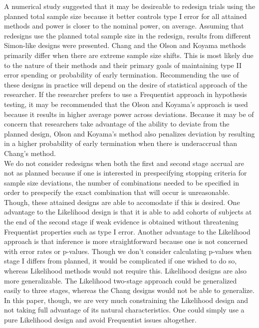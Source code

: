 \documentclass[12pt]{report}\usepackage[]{graphicx}\usepackage[]{color}
\newlength{\li}\setlength{\li}{14.48pt}
\newlength{\di}\setlength{\di}{-3.5mm}
\begin{document}
\indent A numerical study suggested that it may be desireable to redesign trials using the planned total sample size because it better controls type I error for all attained methods and power is closer to the nominal power, on average. Assuming that redesigns use the planned total sample size in the redesign, results from different Simon-like designs were presented.  Chang and the Olson and Koyama methods primarily differ when there are extreme sample size shifts. This is most likely due to the nature of their methods and their primary goals of maintaining type II error spending or probability of early termination. Recommending the use of these designs in practice will depend on the desire of statistical approach of the researcher. If the researcher prefers to use a Frequentist approach in hypothesis testing, it may be recommended that the Olson and Koyama's approach is used because it results in higher average power across deviations. Because it may be of concern that researchers take advantage of the ability to deviate from the planned design, Olson and Koyama's method also penalizes deviation by resulting in a higher probability of early termination when there is underaccrual than Chang's method. \\
\indent We do not consider redesigns when both the first and second stage accrual are not as planned because if one is interested in prespecifying stopping criteria for sample size deviations, the number of combinations needed to be specified in order to prespecify the exact combination that will occur is unreasonable. Though, these attained designs are able to accomodate if this is desired. One advantage to the Likelihood design is that it is able to add cohorts of subjects at the end of the second stage if weak evidence is obtained without threatening Frequentist properties such as type I error. Another advantage to the Likelihood approach is that inference is more straightforward because one is not concerned with error rates or p-values. Though we don't consider calculating p-values when stage I differs from planned, it would be complicated if one wished to do so, whereas Likelihood methods would not require this. Likelihood designs are also more generalizable. The Likelihood two-stage approach could be generalized easily to three stages, whereas the Chang designs would not be able to generalize. In this paper, though, we are very much constraining the Likelihood design and not taking full advantage of its natural characteristics. One could simply use a pure Likelihood design and avoid Frequentist issues altogether. \\
\end{document}
